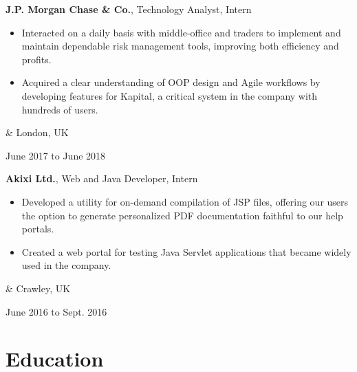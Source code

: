\documentclass[10pt, letterpaper]{article}
\newenvironment{highlights}{
        \begin{itemize}[
                topsep=0pt,
                parsep=0.1 cm,
                partopsep=0pt,
                itemsep=0pt,
                after=\vspace{-1\baselineskip},
                leftmargin=0.7 cm + 3pt
            ]
    }{
        \end{itemize}
    } %
\let\originalTabularx\tabularx
\let\originalEndTabularx\endtabularx
\renewenvironment{tabularx}{\bgroup\centering\originalTabularx}{\originalEndTabularx\par\egroup}
\begin{document}
        \vspace{0.2 cm}
        \begin{tabularx}{
            \textwidth-0.2 cm-0.13cm
        }{
            K{0.1 cm}
            R{4.1 cm}
        }
            \textbf{J.P. Morgan Chase \& Co.}, Technology Analyst, Intern

            \vspace{0.1 cm}

            \begin{highlights}
                \item Interacted on a daily basis with middle-office and traders to implement and maintain dependable risk management tools, improving both efficiency and profits.
                \item Acquired a clear understanding of OOP design and Agile workflows by developing features for Kapital, a critical system in the company with hundreds of users.
            \end{highlights}
            &
            London, UK

            June 2017 to June 2018
        \end{tabularx}

        \vspace{0.2 cm}
        \begin{tabularx}{
            \textwidth-0.2 cm-0.13cm
        }{
            K{0.1 cm}
            R{4.1 cm}
        }
            \textbf{Akixi Ltd.}, Web and Java Developer, Intern

            \vspace{0.1 cm}

            \begin{highlights}
                \item Developed a utility for on-demand compilation of JSP files, offering our users the option to generate personalized PDF documentation faithful to our help portals.
                \item Created a web portal for testing Java Servlet applications that became widely used in the company.
            \end{highlights}
            &
            Crawley, UK

            June 2016 to Sept. 2016
        \end{tabularx}


    
    \section{Education}
\end{document}
